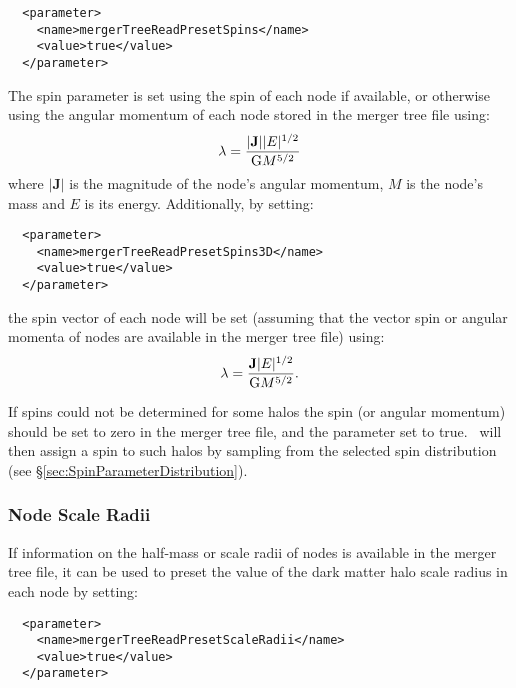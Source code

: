 \begin{verbatim}
  <parameter>
    <name>mergerTreeReadPresetSpins</name>
    <value>true</value>
  </parameter>
\end{verbatim}

The spin parameter is set using the spin of each node if available, or otherwise using the angular momentum of each node stored in the merger tree file using:
\begin{equation}
 \lambda = {|{\mathbf J}| |E|^{1/2} \over {\mathrm G} M^{5/2}}
\end{equation}
where $|{\mathbf J}|$ is the magnitude of the node's angular momentum, $M$ is the node's mass and $E$ is its energy. Additionally, by setting:

\begin{verbatim}
  <parameter>
    <name>mergerTreeReadPresetSpins3D</name>
    <value>true</value>
  </parameter>
\end{verbatim}
the spin vector of each node will be set (assuming that the vector spin or angular momenta of nodes are available in the merger tree file) using:
\begin{equation}
 {\boldmath \lambda} = {{\mathbf J} |E|^{1/2} \over {\mathrm G} M^{5/2}}.
\end{equation}

If spins could not be determined for some halos the spin (or angular momentum) should be set to zero in the merger tree file, and the parameter {\normalfont \ttfamily [mergerTreeReadPresetUnphysicalSpins]} set to {\normalfont \ttfamily true}. \glc\ will then assign a spin to such halos by sampling from the selected spin distribution (see \S\ref{sec:SpinParameterDistribution}). 

\subsubsection{Node Scale Radii}

If information on the half-mass or scale radii of nodes is available in the merger tree file, it can be used to preset the value of the dark matter halo scale radius in each node by setting:

\begin{verbatim}
  <parameter>
    <name>mergerTreeReadPresetScaleRadii</name>
    <value>true</value>
  </parameter>
\end{verbatim}

